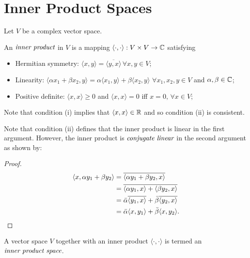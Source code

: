 \section{Inner Product Spaces} %
\label{sec:innerproductspaces}

Let $V$ be a complex vector space.

\begin{defn}
	An $\emph{inner product}$ in $V$ is a mapping $\langle \cdot , \cdot \rangle : V \times V \to \mathbb{C}$
	satisfying
	\begin{itemize}
		\item Hermitian symmetry: $\langle x,y \rangle = \overline{\langle y,x \rangle} \, \forall x,y \in V$;
		\item Linearity:
			$\langle \alpha x_1 + \beta x_2,y \rangle = \alpha \langle x_1,y \rangle + \beta \langle x_2,y \rangle$
			$\forall x_1,x_2,y \in V$ and $\alpha , \beta \in \mathbb{C}$;
		\item Positive definite: $\langle x,x \rangle \geq 0$ and $\langle x,x \rangle =0$ iff $x=0, \, \forall x \in V$;
	\end{itemize}
\end{defn}

\begin{rem}
	Note that condition (i) implies that $\langle x,x \rangle \in \mathbb{R}$ and so condition (ii) is consistent.
\end{rem}

\begin{rem}
	Note that condition (ii) defines that the inner product is linear in the first argument. However,
	the inner product is $\emph{conjugate linear}$ in the second argument as shown by:
	\begin{proof}
		\begin{align*}
			\langle x, \alpha y_1 + \beta y_2 \rangle
			&= \overline{\langle \alpha y_1 + \beta y_2, x \rangle}
			\\
			&= \overline{\langle \alpha y_1, x \rangle + \langle \beta y_2, x \rangle}
			\\
			&= \bar{\alpha} \overline{\langle y_1, x \rangle} + \bar{\beta} \overline{\langle y_2, x \rangle}
			\\
			&= \bar{\alpha} \langle x, y_1 \rangle + \bar{\beta} \langle x, y_2 \rangle . \qedhere
		\end{align*}
	\end{proof}
\end{rem}

A vector space $V$ together with an inner product $\langle \cdot, \cdot \rangle$ is termed an
$\emph{inner product space}$.

